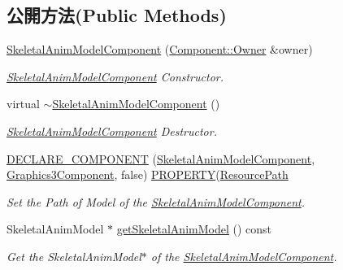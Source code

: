\subsection*{公開方法(Public Methods)}
\begin{DoxyCompactItemize}
\item 
\hyperlink{class_magnum_1_1_skeletal_anim_model_component_ac9854e20c8b7508a771c44bce9e68890}{Skeletal\+Anim\+Model\+Component} (\hyperlink{class_magnum_1_1_component_1_1_owner}{Component\+::\+Owner} \&owner)
\begin{DoxyCompactList}\small\item\em \hyperlink{class_magnum_1_1_skeletal_anim_model_component}{Skeletal\+Anim\+Model\+Component} Constructor. \end{DoxyCompactList}\item 
virtual \hyperlink{class_magnum_1_1_skeletal_anim_model_component_a5d24571e5cc0cab3e121e252d9e45357}{$\sim$\+Skeletal\+Anim\+Model\+Component} ()
\begin{DoxyCompactList}\small\item\em \hyperlink{class_magnum_1_1_skeletal_anim_model_component}{Skeletal\+Anim\+Model\+Component} Destructor. \end{DoxyCompactList}\item 
\hyperlink{class_magnum_1_1_skeletal_anim_model_component_acf449706b9d0bf571e2b78b6ea61e179}{D\+E\+C\+L\+A\+R\+E\+\_\+\+C\+O\+M\+P\+O\+N\+E\+NT} (\hyperlink{class_magnum_1_1_skeletal_anim_model_component}{Skeletal\+Anim\+Model\+Component}, \hyperlink{class_magnum_1_1_graphics3_component}{Graphics3\+Component}, false)       \hyperlink{class_magnum_1_1_component_a30a9f5cf6e5c94519c752f30ac3c6013}{P\+R\+O\+P\+E\+R\+TY}(\hyperlink{class_magnum_1_1_resource_path}{Resource\+Path}
\begin{DoxyCompactList}\small\item\em Set the Path of Model of the \hyperlink{class_magnum_1_1_skeletal_anim_model_component}{Skeletal\+Anim\+Model\+Component}. \end{DoxyCompactList}\item 
Skeletal\+Anim\+Model $\ast$ \hyperlink{class_magnum_1_1_skeletal_anim_model_component_a33c9ffacdfd2ec26187c448cc98269fa}{get\+Skeletal\+Anim\+Model} () const 
\begin{DoxyCompactList}\small\item\em Get the Skeletal\+Anim\+Model$\ast$ of the \hyperlink{class_magnum_1_1_skeletal_anim_model_component}{Skeletal\+Anim\+Model\+Component}. \end{DoxyCompactList}\item 

\end{DoxyCompactItemize}
